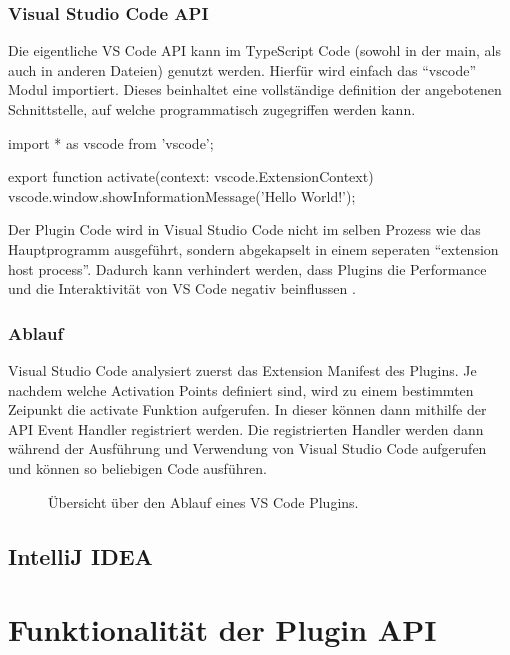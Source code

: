 \subsubsection{Visual Studio Code API} 
  Die eigentliche VS Code API kann im TypeScript Code (sowohl in der main, 
  als auch in anderen Dateien) genutzt werden. Hierfür wird einfach das \enquote{vscode}
  Modul importiert. Dieses beinhaltet eine vollständige definition der angebotenen
  Schnittstelle, auf welche programmatisch zugegriffen werden kann.
  \begin{JsCode}
    import * as vscode from 'vscode';

    export function activate(context: vscode.ExtensionContext) {
      vscode.window.showInformationMessage('Hello World!');
    }
  \end{JsCode}
  Der Plugin Code wird in Visual Studio Code nicht im selben Prozess wie das
  Hauptprogramm ausgeführt, sondern abgekapselt in einem seperaten 
  \enquote{extension host process}. Dadurch kann verhindert werden, dass
  Plugins die Performance und die Interaktivität von VS Code negativ beinflussen 
  \cite{VSCodeArchitecture,VSCodeApproachToExtensibility}.
\subsubsection{Ablauf}
  Visual Studio Code analysiert zuerst das Extension Manifest des Plugins.
  Je nachdem welche Activation Points definiert sind, wird zu einem
  bestimmten Zeipunkt die activate Funktion aufgerufen. In dieser 
  können dann mithilfe der API Event Handler registriert werden. 
  Die registrierten Handler werden dann während der Ausführung und Verwendung
  von Visual Studio Code aufgerufen und können so beliebigen Code ausführen.
  \begin{figure}
    \centering
    \caption{Übersicht über den Ablauf eines VS Code Plugins.}
    \label{fig:diagram_VSCodeExtensionArchitecture}
  \end{figure}   

\subsection{IntelliJ IDEA}


\section{Funktionalität der Plugin API}
\label{sec:FunktionalitätDerPluginAPI}

